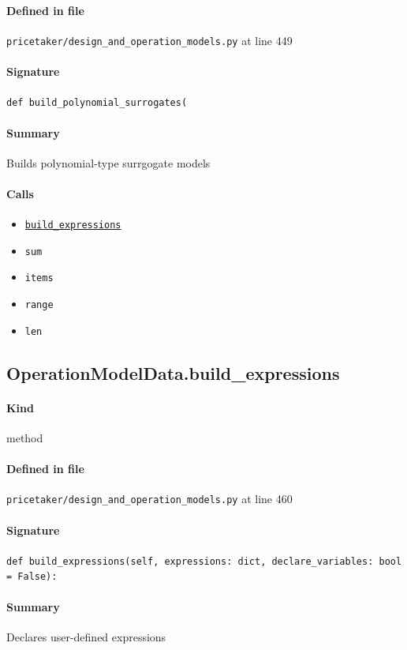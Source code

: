 \documentclass[11pt]{report}
\begin{document}
\paragraph{Defined in file} \texttt{pricetaker/design\_and\_operation\_models.py} at line 449
\paragraph{Signature} \texttt{def build\_polynomial\_surrogates(}
\paragraph{Summary} Builds polynomial-type surrgogate models
\paragraph{Calls}
\begin{itemize}[leftmargin=*]
  \item \hyperref[def:pricetaker-design_and_operation_models.py:OperationModelData.build_expressions:L460]{\texttt{build\_expressions}}
  \item \texttt{sum}
  \item \texttt{items}
  \item \texttt{range}
  \item \texttt{len}
\end{itemize}
\subsection{OperationModelData.build\_expressions}
\label{def:pricetaker-design_and_operation_models.py:OperationModelData.build_expressions:L460}
\paragraph{Kind} method
\paragraph{Defined in file} \texttt{pricetaker/design\_and\_operation\_models.py} at line 460
\paragraph{Signature} \texttt{def build\_expressions(self, expressions: dict, declare\_variables: bool = False):}
\paragraph{Summary} Declares user-defined expressions
\end{document}
